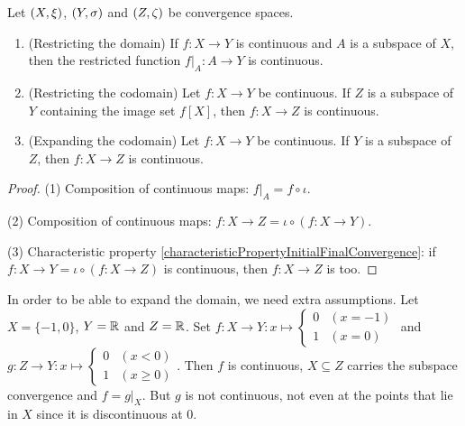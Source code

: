 \begin{proposition} \label{continuityRestrictionExpansion}
Let $\sSet{X,\xi}$, $\sSet{Y,\sigma}$ and $\sSet{Z,\zeta}$ be convergence spaces.
\begin{enumerate}
\item \textup{(Restricting the domain)} If $f:X\to Y$ is continuous and $A$ is a subspace of $X$, then the restricted function $f|_{A}:A\to Y$ is continuous.
\item \textup{(Restricting the codomain)} Let $f:X\to Y$ be continuous. If $Z$ is a subspace of $Y$ containing the image set $f[X]$, then $f:X\to Z$ is continuous.
\item \textup{(Expanding the codomain)} Let $f:X\to Y$ be continuous. If $Y$ is a subspace of $Z$, then $f:X\to Z$ is continuous.
\end{enumerate}
\end{proposition}
\begin{proof}
(1) Composition of continuous maps: $f|_{A} = f\circ\iota$.

(2) Composition of continuous maps: $f:X\to Z = \iota \circ (f: X\to Y)$.

(3) Characteristic property \ref{characteristicPropertyInitialFinalConvergence}: if $f:X\to Y = \iota \circ (f:X\to Z)$ is continuous, then $f:X\to Z$ is too.
\end{proof}

\begin{example}
In order to be able to expand the domain, we need extra assumptions. Let $X = \{-1,0\}$, $Y = \mathbb{R}$ and $Z = \mathbb{R}$. Set $f: X\to Y: x\mapsto \begin{cases}
0 & (x=-1) \\ 1 & (x = 0)
\end{cases}$ and $g: Z\to Y: x\mapsto \begin{cases}
0 & (x < 0) \\
1 & (x \geq 0)
\end{cases}$. Then $f$ is continuous, $X \subseteq Z$ carries the subspace convergence and $f = g|_X$. But $g$ is not continuous, not even at the points that lie in $X$ since it is discontinuous at $0$.
\end{example}

